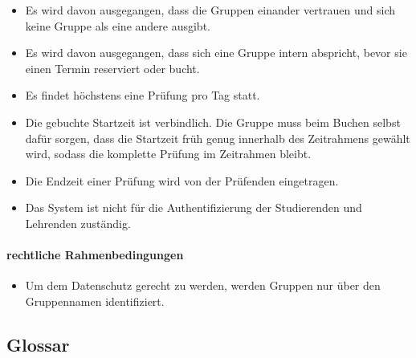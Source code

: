 \documentclass[]{article}
\providecommand{\tightlist}{%
  \setlength{\itemsep}{0pt}\setlength{\parskip}{0pt}}
\let\oldparagraph\paragraph
\renewcommand{\paragraph}[1]{\oldparagraph{#1}\mbox{}}
\begin{document}
\begin{itemize}
\tightlist
\item
  Es wird davon ausgegangen, dass die Gruppen einander vertrauen und
  sich keine Gruppe als eine andere ausgibt.
\item
  Es wird davon ausgegangen, dass sich eine Gruppe intern abspricht,
  bevor sie einen Termin reserviert oder bucht.
\item
  Es findet höchstens eine Prüfung pro Tag statt.
\item
  Die gebuchte Startzeit ist verbindlich. Die Gruppe muss beim Buchen
  selbst dafür sorgen, dass die Startzeit früh genug innerhalb des
  Zeitrahmens gewählt wird, sodass die komplette Prüfung im Zeitrahmen
  bleibt.
\item
  Die Endzeit einer Prüfung wird von der Prüfenden eingetragen.
\item
  Das System ist nicht für die Authentifizierung der Studierenden und
  Lehrenden zuständig.
\end{itemize}

\hypertarget{rechtliche-rahmenbedingungen}{%
\paragraph{rechtliche
Rahmenbedingungen}\label{rechtliche-rahmenbedingungen}}

\begin{itemize}
\tightlist
\item
  Um dem Datenschutz gerecht zu werden, werden Gruppen nur über den
  Gruppennamen identifiziert.
\end{itemize}

\hypertarget{glossar}{%
\subsection{Glossar}\label{glossar}}
\end{document}
